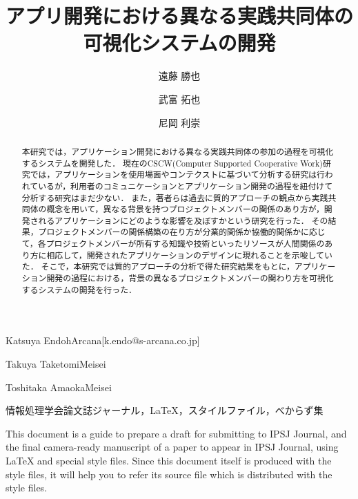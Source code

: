 \documentclass[submit,techrep]{ipsj}
\begin{document}
\title{アプリ開発における異なる実践共同体の\\
可視化システムの開発}




\author{遠藤 勝也}{Katsuya Endoh}{Arcana}[k.endo@s-arcana.co.jp]
\author{武富 拓也}{Takuya Taketomi}{Meisei}
\author{尼岡 利崇}{Toshitaka Amaoka}{Meisei}

\begin{abstract}
本研究では，アプリケーション開発における異なる実践共同体の参加の過程を可視化するシステムを開発した．
現在のCSCW(Computer Supported Cooperative Work)研究では，アプリケーションを使用場面やコンテクストに基づいて分析する研究は行われているが，利用者のコミュニケーションとアプリケーション開発の過程を紐付けて分析する研究はまだ少ない．
また，著者らは過去に質的アプローチの観点から実践共同体の概念を用いて，異なる背景を持つプロジェクトメンバーの関係のあり方が，開発されるアプリケーションにどのような影響を及ぼすかという研究を行った．
その結果，プロジェクトメンバーの関係構築の在り方が分業的関係か協働的関係かに応じて，各プロジェクトメンバーが所有する知識や技術といったリソースが人間関係のあり方に相応して，開発されたアプリケーションのデザインに現れることを示唆していた．
そこで，本研究では質的アプローチの分析で得た研究結果をもとに，アプリケーション開発の過程における，背景の異なるプロジェクトメンバーの関わり方を可視化するシステムの開発を行った．
\end{abstract}


\begin{jkeyword}
情報処理学会論文誌ジャーナル，\LaTeX，スタイルファイル，べからず集
\end{jkeyword}

\begin{eabstract}
This document is a guide to prepare a draft for submitting to IPSJ
Journal, and the final camera-ready manuscript of a paper to appear in
IPSJ Journal, using {\LaTeX} and special style files.  Since this
document itself is produced with the style files, it will help you to
refer its source file which is distributed with the style files.
\end{eabstract}
\end{document}
